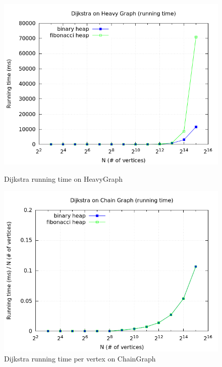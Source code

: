 \documentclass[a4paper,oneside,article,11pt]{memoir}
\begin{document}
\begin{figure}[H]
\centering
\begin{minipage}{0.48\columnwidth}
  \centering
  \includegraphics[width=\linewidth]{../res/dijkstra/d_heavy_rt.png}%
  \caption{Dijkstra running time on HeavyGraph}
  \label{fig:dijkstra_heavy_rt}
\end{minipage}%
\hfill
\begin{minipage}{0.48\columnwidth}
  \centering
  \includegraphics[width=\linewidth]{../res/dijkstra/d_chain_rt_div_n.png}%
  \caption{Dijkstra running time per vertex on ChainGraph}
  \label{fig:dijkstra_chain_rt_div_n}
\end{minipage}
\end{figure}
\end{document}
